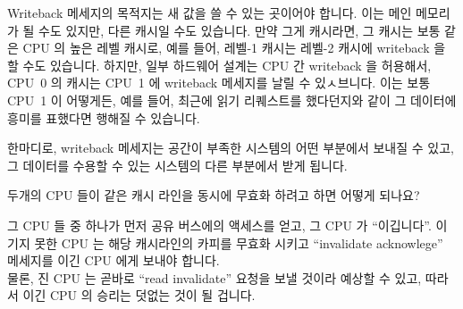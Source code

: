 \begin{enumerate}
	Writeback 메세지의 목적지는 새 값을 쓸 수 있는 곳이어야 합니다.
	이는 메인 메모리가 될 수도 있지만, 다른 캐시일 수도 있습니다.
	만약 그게 캐시라면, 그 캐시는 보통 같은 CPU 의 높은 레벨 캐시로, 예를
	들어, 레벨-1 캐시는 레벨-2 캐시에 writeback 을 할 수도 있습니다.
	하지만, 일부 하드웨어 설계는 CPU 간 writeback 을 허용해서, CPU~0 의
	캐시는 CPU~1 에 writeback 메세지를 날릴 수 있ㅅ브니다.
	이는 보통 CPU~1 이 어떻게든, 예를 들어, 최근에 읽기 리퀘스트를
	했다던지와 같이 그 데이터에 흥미를 표했다면 행해질 수 있습니다.

	한마디로, writeback 메세지는 공간이 부족한 시스템의 어떤 부분에서
	보내질 수 있고, 그 데이터를 수용할 수 있는 시스템의 다른 부분에서 받게
	됩니다.

\QuickQ{}
	두개의 CPU 들이 같은 캐시 라인을 동시에 무효화 하려고 하면 어떻게
	되나요?

\QuickA{}
	그 CPU 들 중 하나가 먼저 공유 버스에의 액세스를 얻고, 그 CPU 가
	``이깁니다''.
	이기지 못한 CPU 는 해당 캐시라인의 카피를 무효화 시키고 ``invalidate
	acknowlege'' 메세지를 이긴 CPU 에게 보내야 합니다. \\
	물론, 진 CPU 는 곧바로 ``read invalidate'' 요청을 보낼 것이라 예상할 수
	있고, 따라서 이긴 CPU 의 승리는 덧없는 것이 될 겁니다.

\end{enumerate}
